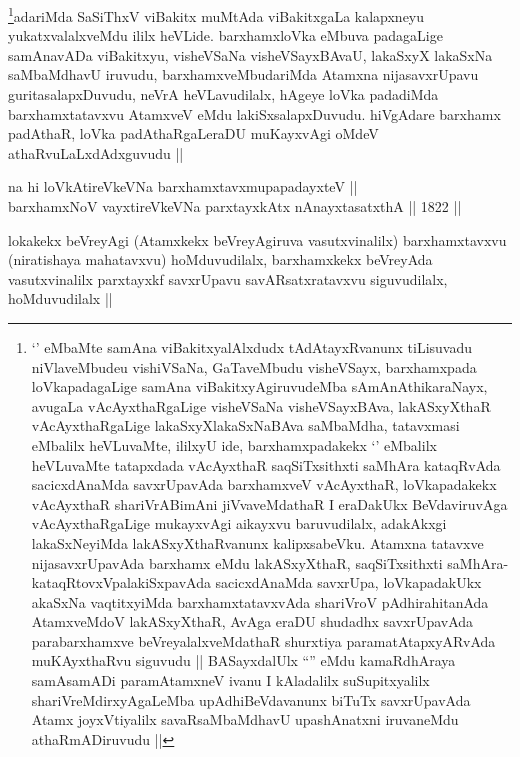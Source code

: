 \begin{artha}
\footnote[1]{`\stext' eMbaMte samAna viBakitxyalAlxdudx
  tAdAtayxRvanunx tiLisuvadu niVlaveMbudeu vishiVSaNa, GaTaveMbudu
  visheVSayx, barxhamxpada loVkapadagaLige samAna
  viBakitxyAgiruvudeMba sAmAnAthikaraNayx, avugaLa vAcAyxthaRgaLige
  visheVSaNa visheVSayxBAva, lakASxyXthaR vAcAyxthaRgaLige
  lakaSxyXlakaSxNaBAva saMbaMdha, tatavxmasi eMbalilx heVLuvaMte,
  ililxyU ide, barxhamxpadakekx `\stext' eMbalilx heVLuvaMte
  tatapxdada vAcAyxthaR saqSiTxsithxti saMhAra kataqRvAda
  sacicxdAnaMda savxrUpavAda barxhamxveV vAcAyxthaR, loVkapadakekx
  vAcAyxthaR shariVrABimAni jiVvaveMdathaR I eraDakUkx BeVdaviruvAga
  vAcAyxthaRgaLige mukayxvAgi aikayxvu baruvudilalx, adakAkxgi
  lakaSxNeyiMda lakASxyXthaRvanunx kalipxsabeVku. Atamxna tatavxve
  nijasavxrUpavAda barxhamx eMdu lakASxyXthaR, saqSiTxsithxti
  saMhAra-kataqRtovxVpalakiSxpavAda sacicxdAnaMda savxrUpa,
  loVkapadakUkx akaSxNa vaqtitxyiMda barxhamxtatavxvAda shariVroV
  pAdhirahitanAda AtamxveMdoV lakASxyXthaR, AvAga eraDU shudadhx
  savxrUpavAda parabarxhamxve beVreyalalxveMdathaR shurxtiya
  paramatAtapxyARvAda muKAyxthaRvu siguvudu || BASayxdalUlx ``\stext''
  eMdu kamaRdhAraya samAsamADi paramAtamxneV ivanu I kAladalilx
  suSupitxyalilx shariVreMdirxyAgaLeMba upAdhiBeVdavanunx biTuTx
  savxrUpavAda Atamx joyxVtiyalilx savaRsaMbaMdhavU upashAnatxni
  iruvaneMdu athaRmADiruvudu ||}adariMda SaSiThxV viBakitx muMtAda viBakitxgaLa
kalapxneyu yukatxvalalxveMdu ililx heVLide. barxhamxloVka eMbuva
padagaLige samAnavADa viBakitxyu, visheVSaNa visheVSayxBAvaU, lakaSxyX
lakaSxNa saMbaMdhavU iruvudu, barxhamxveMbudariMda Atamxna
nijasavxrUpavu guritasalapxDuvudu, neVrA heVLavudilalx, hAgeye loVka
padadiMda barxhamxtatavxvu AtamxveV eMdu lakiSxsalapxDuvudu. hiVgAdare
barxhamx padAthaR, loVka padAthaRgaLeraDU muKayxvAgi oMdeV
athaRvuLaLxdAdxguvudu ||                                              
\end{artha}

\begin{shl}
na hi loVkAtireVkeVNa barxhamxtavxmupapadayxteV ||  \\
barxhamxNoV vayxtireVkeVNa parxtayxkAtx nAnayxtasatxthA ||  1822 ||  
\end{shl}

\begin{artha}
lokakekx beVreyAgi (Atamxkekx beVreyAgiruva vasutxvinalilx)
barxhamxtavxvu (niratishaya mahatavxvu) hoMduvudilalx, barxhamxkekx
beVreyAda vasutxvinalilx parxtayxkf savxrUpavu savARsatxratavxvu
siguvudilalx, hoMduvudilalx ||
\end{artha}

